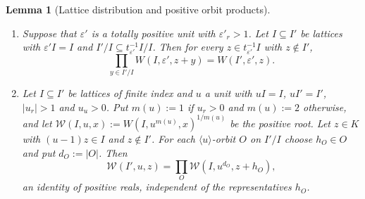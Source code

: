 \documentclass[11pt]{amsart}
\numberwithin{equation}{section}
\theoremstyle{plain}
\newtheorem{lemma}[theorem]{Lemma}
\theoremstyle{definition}
\theoremstyle{remark}
\begin{document}
\begin{lemma}[Lattice distribution and positive orbit products]\label{lem:dist}
\begin{enumerate}
\item[(a)] Suppose that \(\varepsilon'\) is a totally positive unit with \(\varepsilon'_r>1\). Let \(I\subseteq I'\) be lattices with \(\varepsilon'I=I\) and \(I'/I\subseteq t_{\varepsilon'}^{-1}I/I\). Then for every \(z\in t_{\varepsilon'}^{-1}I\) with \(z\notin I'\),
\[\prod_{y\in I'/I}W(I,\varepsilon',z+y)=W(I',\varepsilon',z).\]
\item[(b)] Let \(I\subseteq I'\) be lattices of finite index and \(u\) a unit with \(uI=I\), \(uI'=I'\), \(|u_r|>1\) and \(u_u>0\). Put \(m(u):=1\) if \(u_r>0\) and \(m(u):=2\) otherwise, and let \(\mathcal W(I,u,x):=W(I,u^{m(u)},x)^{1/m(u)}\) be the positive root. Let \(z\in K\) with \((u-1)z\in I\) and \(z\notin I'\). For each \(\langle u\rangle\)-orbit \(O\) on \(I'/I\) choose \(h_O\in O\) and put \(d_O:=|O|\). Then
\[\mathcal W(I',u,z)=\prod_O\mathcal W(I,u^{d_O},z+h_O),\]
an identity of positive reals, independent of the representatives \(h_O\).
\end{enumerate}
\end{lemma}
\end{document}
